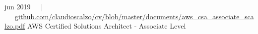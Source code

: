 



\begin{cventries}

	\cvproj
        {jun 2019~~~|~~~\href{https://github.com/claudioscalzo/cv/blob/master/documents/aws\_csa\_associate\_scalzo.pdf}{github.com/claudioscalzo/cv/blob/master/documents/aws\_csa\_associate\_scalzo.pdf}}
        {AWS Certified Solutions Architect - Associate Level}
        {}
        {}
        {}
\end{cventries}
